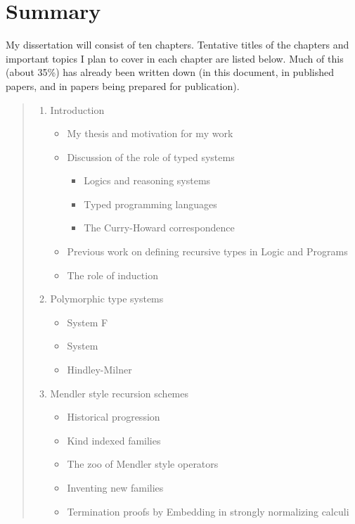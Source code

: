 \section{Summary}\label{sec:summary}
My dissertation will consist of ten chapters.
Tentative titles of the chapters and important topics I plan to cover in each
chapter are listed below. Much of this (about 35\%) has already been written down
(in this document, in published papers, and in papers being prepared
for publication). 
\begin{quote}
\begin{enumerate}[1.]
\item Introduction
\begin{itemize}
\item My thesis and motivation for my work
\item Discussion of the role of typed systems
   \begin{itemize}
     \item Logics and reasoning systems
     \item Typed programming languages
     \item The Curry-Howard correspondence
   \end{itemize}
\item Previous work on defining recursive types in Logic and Programs
\item The role of induction
\end{itemize}

\item Polymorphic type systems 
 \begin{itemize}
     \item System \textsf{F}
     \item System \Fw
     \item Hindley-Milner
 \end{itemize}
 
\item Mendler style recursion schemes
  \begin{itemize}
     \item Historical progression
     \item Kind indexed families
     \item The zoo of Mendler style operators
     \item Inventing new families
     \item Termination proofs by Embedding in strongly normalizing calculi
  \end{itemize}


\end{enumerate}
\end{quote}

